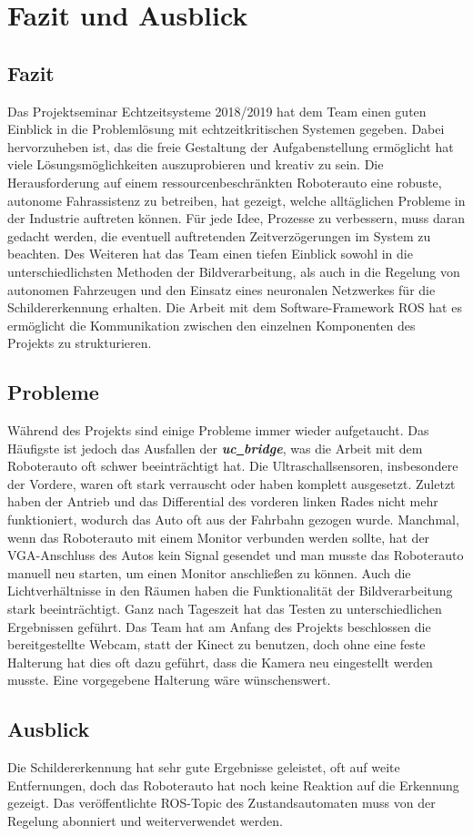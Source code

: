 \section{Fazit und Ausblick}
\label{sec:fazit}

\subsection{Fazit}
Das Projektseminar Echtzeitsysteme 2018/2019 hat dem Team einen guten Einblick in die Probleml\"osung mit echtzeitkritischen Systemen gegeben. Dabei hervorzuheben ist, das die freie Gestaltung der Aufgabenstellung erm\"oglicht hat viele L\"osungsm\"oglichkeiten auszuprobieren und kreativ zu sein. Die Herausforderung auf einem ressourcenbeschr\"ankten Roboterauto eine robuste, autonome Fahrassistenz zu betreiben, hat gezeigt, welche allt\"aglichen Probleme in der Industrie auftreten k\"onnen. F\"ur jede Idee, Prozesse zu verbessern, muss daran gedacht werden, die eventuell auftretenden Zeitverz\"ogerungen im System zu beachten. Des Weiteren hat das Team einen tiefen Einblick sowohl in die unterschiedlichsten Methoden der Bildverarbeitung, als auch in die Regelung von autonomen Fahrzeugen und den Einsatz eines neuronalen Netzwerkes f\"ur die Schildererkennung erhalten. Die Arbeit mit dem Software-Framework ROS\cite{ROS} hat es erm\"oglicht die Kommunikation zwischen den einzelnen Komponenten des Projekts zu strukturieren.

\subsection{Probleme}
W\"ahrend des Projekts sind einige Probleme immer wieder aufgetaucht. Das H\"aufigste ist jedoch das Ausfallen der \textbf{\textit{uc\underline{\ }bridge}}, was die Arbeit mit dem Roboterauto oft schwer beeintr\"achtigt hat. Die Ultraschallsensoren, insbesondere der Vordere, waren oft stark verrauscht oder haben komplett ausgesetzt. Zuletzt haben der Antrieb und das Differential des vorderen linken Rades nicht mehr funktioniert, wodurch das Auto oft aus der Fahrbahn gezogen wurde. Manchmal, wenn das Roboterauto mit einem Monitor verbunden werden sollte, hat der VGA-Anschluss des Autos kein Signal gesendet und man musste das Roboterauto manuell neu starten, um einen Monitor anschlie\ss{}en zu k\"onnen. Auch die Lichtverh\"altnisse in den R\"aumen haben die Funktionalit\"at der Bildverarbeitung stark beeintr\"achtigt. Ganz nach Tageszeit hat das Testen zu unterschiedlichen Ergebnissen gef\"uhrt. Das Team hat am Anfang des Projekts beschlossen die bereitgestellte Webcam, statt der Kinect zu benutzen, doch ohne eine feste Halterung hat dies oft dazu gef\"uhrt, dass die Kamera neu eingestellt werden musste. Eine vorgegebene Halterung w\"are w\"unschenswert.

\subsection{Ausblick}
Die Schildererkennung hat sehr gute Ergebnisse geleistet, oft auf weite Entfernungen, doch das Roboterauto hat noch keine Reaktion auf die Erkennung gezeigt. Das ver\"offentlichte ROS-Topic des Zustandsautomaten muss von der Regelung abonniert und weiterverwendet werden.